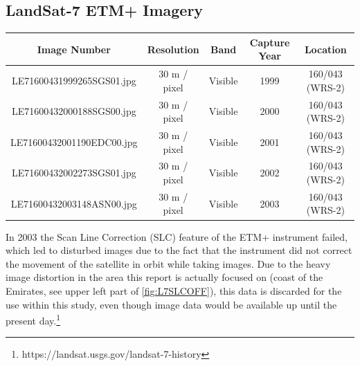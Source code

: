\subsection{LandSat-7 ETM+ Imagery}

\begin{table} [h!]
	\centering
	\begin{tabular}{| c | c | c | c | c |}
	\hline
	\textbf{Image Number} & \textbf{Resolution} & \textbf{Band} & \textbf{Capture Year} & \textbf{Location} \\ \hline
	LE71600431999265SGS01.jpg & 30 m / pixel& Visible & 1999 & 160/043 (WRS-2) \\ \hline 
	LE71600432000188SGS00.jpg & 30 m / pixel& Visible & 2000 & 160/043 (WRS-2) \\ \hline 
	LE71600432001190EDC00.jpg & 30 m / pixel& Visible & 2001 & 160/043 (WRS-2) \\ \hline 
	LE71600432002273SGS01.jpg & 30 m / pixel& Visible & 2002 & 160/043 (WRS-2) \\ \hline 
	LE71600432003148ASN00.jpg & 30 m / pixel& Visible & 2003 & 160/043 (WRS-2) \\ \hline 
	\end{tabular}
\end{table}

In 2003 the Scan Line Correction (SLC) feature of the ETM+ instrument failed, which led to disturbed images due to the fact that the instrument did not correct the movement of the satellite in orbit while taking images. Due to the heavy image distortion in the area this report is actually focused on (coast of the Emirates, see upper left part of \cref{fig:L7SLCOFF}), this data is discarded for the use within this study, even though image data would be available up until the present day.\footnote{https://landsat.usgs.gov/landsat-7-history}



